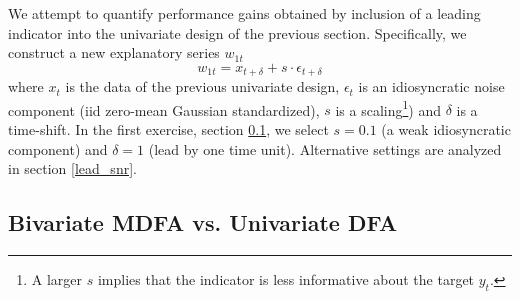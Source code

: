 \documentclass[a4paper]{book}
\begin{document}
We attempt to quantify performance gains obtained by inclusion of a leading indicator into the univariate design of the previous section. Specifically, we construct a new explanatory  series $w_{1t}$ 
\begin{equation}\label{def_led_i}
w_{1t}=x_{t+\delta}+s\cdot\epsilon_{t+\delta}
\end{equation}
where $x_t$ is the data of the previous univariate design, $\epsilon_t$ is an idiosyncratic noise component (iid zero-mean Gaussian standardized), $s$ is a scaling\footnote{A larger $s$ implies that the indicator is less informative about the target $y_t$.}) and $\delta$ is a time-shift. 
In the first exercise, section \ref{bimdfaudfa}, we select $s=0.1$ (a weak idiosyncratic component) and $\delta=1$ (lead by one time unit). Alternative settings are analyzed in section \ref{lead_snr}.

\subsection{Bivariate MDFA vs. Univariate DFA}\label{bimdfaudfa}
\end{document}
